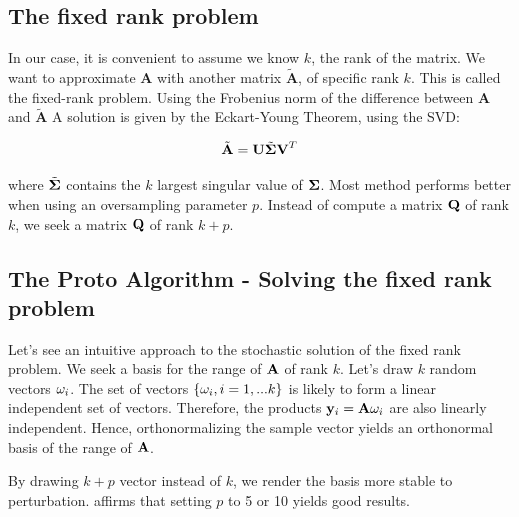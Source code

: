 \documentclass[onecolumn,12pt]{article}
\begin{document}
\subsection{The fixed rank problem}

In our case, it is convenient to assume we know $k$, the rank of the matrix.
We want to approximate $\textbf{A}$ with another matrix $\tilde{\textbf{A}}$,
of specific rank $k$. This is called the fixed-rank problem. Using the
Frobenius norm of the difference between $\textbf{A}$ and $\tilde{\textbf{A}}$
A solution is given by the  Eckart-Young Theorem, using the SVD:

$$\tilde{\textbf{A}} = \textbf{U} \tilde{\bold{\Sigma}} \textbf{V}^T$$

where $\tilde{\bold{\Sigma}}$ contains the $k$ largest singular value of
$\bold{\Sigma}$. Most method performs better when using an oversampling
parameter $p$.  Instead of compute a matrix $\bold{Q}$ of rank
$k$, we seek a matrix $\bold{Q}$ of rank $k + p$.

\subsection{The Proto Algorithm - Solving the fixed rank problem}

Let's see an intuitive approach to the stochastic solution of the fixed rank
problem. We seek a basis for the range of $\bold{A}$ of rank $k$. Let's
draw $k$ random vectors $\bold{\omega}_i$. The set of vectors $\{
\bold{\omega}_i, i=1,...k\}$ is likely to form a linear independent set of
vectors. Therefore, the products $\bold{y}_i = \bold{A} \bold{\omega}_i$ are
also linearly independent. Hence, orthonormalizing the sample vector yields an
orthonormal basis of the range of $\bold{A}$.


\noindent{}

By drawing $k + p$ vector instead of $k$, we render the basis more stable to
perturbation. \cite{structure-randomness} affirms that setting $p$ to 5 or 10
yields good results.
\end{document}
